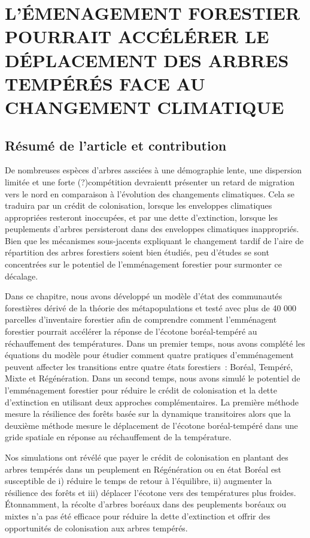 \graphicspath{{chapter1/}{manuscript/}}

\chapter{\textbf{\MakeUppercase{  L'émenagement forestier pourrait
accélérer le déplacement des arbres tempérés face au changement
climatique}}}

\section{Résumé de l'article et contribution}

De nombreuses espèces d'arbres assciées à une démographie lente, une
dispersion limitée et une forte (?)compétition devraientt présenter un
retard de migration vers le nord en comparaison à l'évolution des
changements climatiques. Cela se traduira par un crédit de colonisation,
lorsque les enveloppes climatiques appropriées resteront inoccupées, et
par une dette d'extinction, lorsque les peuplements d'arbres
persisteront dans des enveloppes climatiques inappropriés. Bien que les
mécanismes sous-jacents expliquant le changement tardif de l'aire de
répartition des arbres forestiers soient bien étudiés, peu d'études se
sont concentrées sur le potentiel de l'emménagement forestier pour
surmonter ce décalage.

Dans ce chapitre, nous avons développé un modèle d'état des communautés
forestières dérivé de la théorie des métapopulations et testé avec plus
de 40 000 parcelles d'inventaire forestier afin de comprendre comment
l'emménagent forestier pourrait accélérer la réponse de l'écotone
boréal-tempéré au réchauffement des températures. Dans un premier temps,
nous avons complété les équations du modèle pour étudier comment quatre
pratiques d'emménagement peuvent affecter les transitions entre quatre
états forestiers~: Boréal, Tempéré, Mixte et Régénération. Dans un
second temps, nous avons simulé le potentiel de l'emménagement forestier
pour réduire le crédit de colonisation et la dette d'extinction en
utilisant deux approches complémentaires. La première méthode mesure la
résilience des forêts basée sur la dynamique transitoires alors que la
deuxième méthode mesure le déplacement de l'écotone boréal-tempéré dans
une gride spatiale en réponse au réchauffement de la température.

Nos simulations ont révélé que payer le crédit de colonisation en
plantant des arbres tempérés dans un peuplement en Régénération ou en
état Boréal est susceptible de i) réduire le temps de retour à
l'équilibre, ii) augmenter la résilience des forêts et iii) déplacer
l'écotone vers des températures plus froides. Étonnamment, la récolte
d'arbres boréaux dans des peuplements boréaux ou mixtes n'a pas été
efficace pour réduire la dette d'extinction et offrir des opportunités
de colonisation aux arbres tempérés.

